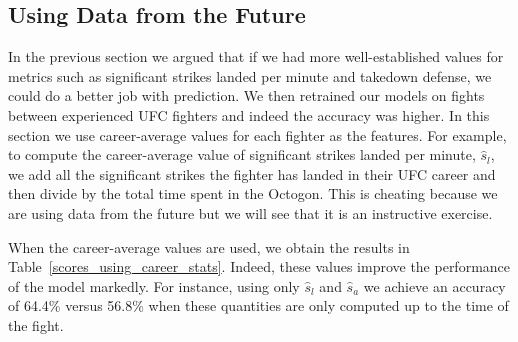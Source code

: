 \clearpage
\subsection*{Using Data from the Future}

In the previous section we argued that if we had more
well-established values for metrics such as significant strikes
landed per minute and takedown defense, we could do a better
job with prediction. We then retrained our models on
fights between experienced UFC fighters
and indeed the accuracy was higher. In this section we use
career-average values for each fighter as the features.
For example, to compute the career-average value of significant
strikes landed per minute, $\hat{s}_l$, we add all the significant strikes
the fighter has landed in their UFC career and then divide by the
total time spent in the Octogon. This
is cheating because we are using data from the future but we
will see that it is an instructive exercise.

When the career-average values are used, we obtain the results
in Table~\ref{scores_using_career_stats}. Indeed, these
values improve the performance of the model markedly.
For instance, using only $\hat{s}_l$ and $\hat{s}_a$ we achieve an accuracy of
64.4\% versus 56.8\% when these quantities are only
computed up to the time of the fight.

